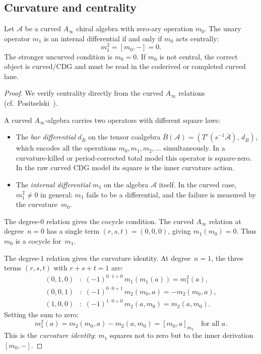 \subsection{Curvature and centrality}

\begin{theorem}\label{thm:curvature-central-appendix}
Let $\mathcal{A}$ be a curved $A_\infty$ chiral algebra with
zero-ary operation $m_0$. The unary operator $m_1$ is an internal
differential if and only if $m_0$ acts centrally:
\[
m_1^2=[m_0,-]=0.
\]
The stronger uncurved condition is $m_0=0$. If $m_0$ is not central,
the correct object is curved/CDG and must be read in the coderived or
completed curved lane.
\end{theorem}

\begin{proof}
We verify centrality directly from the curved $A_\infty$ relations
(cf.~Positselski~\cite{Positselski11}).

A curved $A_\infty$-algebra carries two operators with different
square laws:
\begin{itemize}
\item The \emph{bar differential} $d_{\bar{B}}$ on the tensor coalgebra
$\bar{B}(\mathcal{A}) = (T^c(s^{-1}\bar{\mathcal{A}}),\, d_{\bar{B}})$,
which encodes all the operations $m_0, m_1, m_2, \ldots$
simultaneously. In a curvature-killed or period-corrected total model
this operator is square-zero. In the raw curved CDG model its square is
the inner curvature action.
\item The \emph{internal differential} $m_1$ on the algebra
$\mathcal{A}$ itself. In the curved case, $m_1^2 \neq 0$ in general:
$m_1$ fails to be a differential, and the failure is measured by the
curvature~$m_0$.
\end{itemize}

The degree-$0$ relation gives the cocycle condition.
The curved $A_\infty$ relation at degree~$n=0$ has a single term
$(r,s,t) = (0,0,0)$, giving $m_1(m_0) = 0$. Thus $m_0$ is a cocycle
for~$m_1$.

The degree-$1$ relation gives the curvature identity.
At degree~$n=1$, the three terms $(r,s,t)$ with $r+s+t=1$ are:
\begin{align*}
(0,1,0) &: \; (-1)^{0 \cdot 1 + 0}\, m_1(m_1(a)) = m_1^2(a), \\
(0,0,1) &: \; (-1)^{0 \cdot 0 + 1}\, m_2(m_0, a) = -m_2(m_0, a), \\
(1,0,0) &: \; (-1)^{1 \cdot 0 + 0}\, m_2(a, m_0) = m_2(a, m_0).
\end{align*}
Setting the sum to zero:
\begin{equation}\label{eq:curvature-identity}
m_1^2(a) = m_2(m_0, a) - m_2(a, m_0) = [m_0, a]_{m_2}
\quad \text{for all } a.
\end{equation}
This is the \emph{curvature identity}: $m_1$ squares not to zero but
to the inner derivation $[m_0, -]$.


\end{proof}
